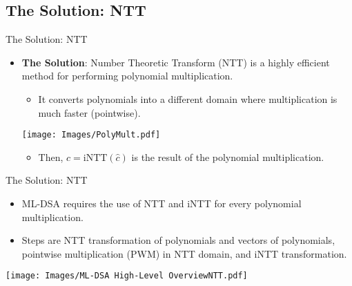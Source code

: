 \documentclass[
	10pt, t,
	hyperref={
		colorlinks,
		citecolor=CtpLatteTeal,
		linkcolor=CtpLatteTeal,
		urlcolor=CtpLatteBlue,
		pdfauthor={Bardia Taghavi},
		pdftitle={LightNTT: A Tiny NTT/iNTT Core for ML-DSA Featuring a Constant-Geometry Pipelined Design},
		pdfsubject={Cryptography},
		pdfkeywords={NTT, iNTT, ML-DSA, Constant-Geometry Pipelined Design},
		pdfcreator={Bardia Taghavi},
		pdfproducer={Bardia Taghavi}
		},
	aspectratio=1610,
	]
	{beamer}
\begin{document}
\subsection{The Solution: NTT}
\begin{frame}{The Solution: NTT}
	\begin{itemize}\setlength{\itemsep}{2ex}
		\item \textbf{The Solution}: Number Theoretic Transform (NTT) is a highly efficient method for performing polynomial multiplication.
		\begin{itemize}\vspace{1ex}
			\item It converts polynomials into a different domain where multiplication is much faster (pointwise).
			\vspace{1ex}
		\end{itemize}
			\texttt{[image: Images/PolyMult.pdf]}
			\vspace{1ex}
		\begin{itemize}
			\item Then, $c = \text{iNTT}(\hat{c})$ is the result of the polynomial multiplication.
			\end{itemize}
		\end{itemize}
\end{frame}
\begin{frame}{The Solution: NTT}
	\begin{itemize}\setlength{\itemsep}{2ex}
		\item ML-DSA requires the use of NTT and iNTT for every polynomial multiplication.
		\item Steps are NTT transformation of polynomials and vectors of polynomials, pointwise multiplication (PWM) in NTT domain, and iNTT transformation.
		\vspace{1.5em}
		\end{itemize}
		\begin{center}
			\texttt{[image: Images/ML-DSA High-Level OverviewNTT.pdf]}
		\end{center}

\end{frame}
\end{document}
